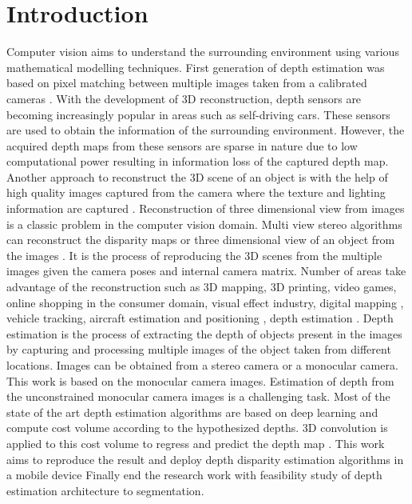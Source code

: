 

    \chapter{Introduction}

    Computer vision aims to understand the surrounding environment using various mathematical modelling techniques. First generation of depth estimation was based on pixel matching between multiple images taken from a calibrated cameras \cite{18_laga2020survey}. With the development of 3D reconstruction, depth sensors are becoming increasingly popular in areas such as self-driving cars. These sensors are used to obtain the information of the surrounding environment. However, the acquired depth maps from these sensors are sparse in nature due to low computational power resulting in information loss of the captured depth map. Another approach to reconstruct the 3D scene of an object is with the help of high quality images captured from the camera where the texture and lighting information are captured \cite{16_zhu2021deep}. Reconstruction of three dimensional view from images is a classic problem in the computer vision domain. Multi view stereo algorithms can reconstruct the disparity maps or three dimensional view of an object from the images \cite{13_chen2021mvsnerf}. It is the process of reproducing the 3D scenes from the multiple images given the camera poses and internal camera matrix. Number of areas take advantage of the reconstruction such as 3D mapping, 3D printing, video games, online shopping in the consumer domain, visual effect industry, digital mapping \cite{01_furukawa2015multi}, vehicle tracking, aircraft estimation and positioning \cite{07_manuel2018disparity}, depth estimation \cite{10_yao2018mvsnet}. Depth estimation is the process of extracting the depth of objects present in the images by capturing and processing multiple images of the object taken from different locations. Images can be obtained from a stereo camera or a monocular camera. This work is based on the monocular camera images. Estimation of depth from the unconstrained monocular camera images is a challenging task. Most of the state of the art depth estimation algorithms are based on deep learning and compute cost volume according to the hypothesized depths. 3D convolution is applied to this cost volume to regress and predict the depth map \cite{17_gu2020cascade}. This work aims to reproduce the result and deploy depth disparity estimation algorithms in a mobile device Finally end the research work with feasibility study of depth estimation architecture to segmentation.
